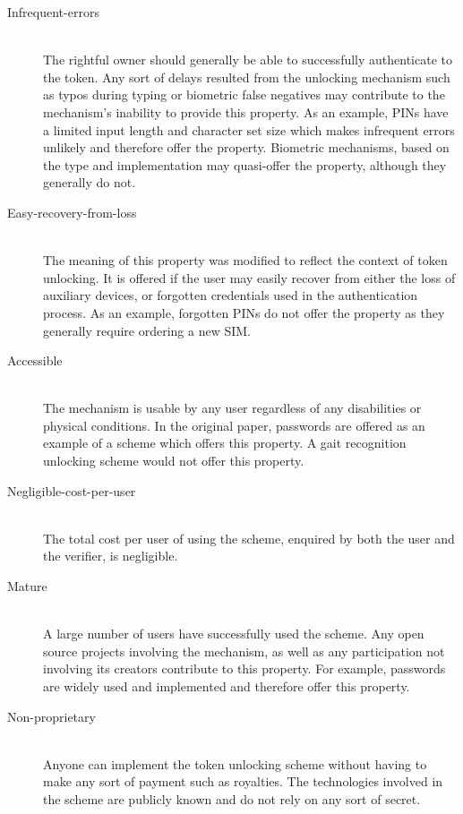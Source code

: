 \begin{description}
  \item[Infrequent-errors] \hfill \\
  The rightful owner should generally be able to successfully authenticate to the token. Any sort of delays resulted from the unlocking mechanism such as typos during typing or biometric false negatives may contribute to the mechanism's inability to provide this property. As an example, PINs have a limited input length and character set size which makes infrequent errors unlikely and therefore offer the property. Biometric mechanisms, based on the type and implementation may quasi-offer the property, although they generally do not.
    
  \item[Easy-recovery-from-loss] \hfill \\ 
  The meaning of this property was modified to reflect the context of token unlocking. It is offered if the user may easily recover from either the loss of auxiliary devices, or forgotten credentials used in the authentication process. As an example, forgotten PINs do not offer the property as they generally require ordering a new SIM.
  
  \item[Accessible] \hfill \\
  The mechanism is usable by any user regardless of any disabilities or physical conditions. In the original paper, passwords are offered as an example of a scheme which offers this property. A gait recognition unlocking scheme would not offer this property. 
  
  \item[Negligible-cost-per-user] \hfill \\
  The total cost per user of using the scheme, enquired by both the user and the verifier, is negligible.
  
  \item[Mature] \hfill \\
  A large number of users have successfully used the scheme. Any open source projects involving the mechanism, as well as any participation not involving its creators contribute to this property. For example, passwords are widely used and implemented and therefore offer this property.
  
  \item[Non-proprietary] \hfill \\
  Anyone can implement the token unlocking scheme without having to make any sort of payment such as royalties. The technologies involved in the scheme are publicly known and do not rely on any sort of secret.
  

\end{description}
